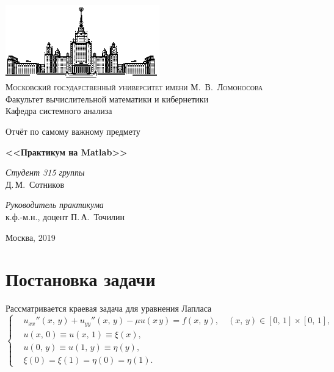 \documentclass[11pt]{article}
\begin{document}
\thispagestyle{empty}

\begin{center}
\ \vspace{-3cm}

\includegraphics[width=0.5\textwidth]{msu.eps}\\
{\scshape Московский государственный университет имени М.~В.~Ломоносова}\\
Факультет вычислительной математики и кибернетики\\
Кафедра системного анализа

\vfill

{\LARGE Отчёт по самому важному предмету}

\vspace{1cm}

{\Huge\bfseries <<Практикум на Matlab>>}
\end{center}

\vspace{1cm}

\begin{flushright}
  \large
  \textit{Студент 315 группы}\\
  Д.\,М.~Сотников

  \vspace{5mm}

  \textit{Руководитель практикума}\\
  к.ф.-м.н., доцент П.\,А.~Точилин
\end{flushright}

\vfill

\begin{center}
Москва, 2019
\end{center}

\newpage
\section{Постановка задачи}
Рассматривается краевая задача для уравнения Лапласа
\begin{equation}
\left\{
	\begin{aligned}
		& u_{xx}''\left(x, \, y\right) + u_{yy}''\left(x, \, y\right) - \mu u\left(x\, y\right) = \label{problem}
		f\left(x, \, y\right), \quad \left(x, \, y\right) \in \left[0, \, 1\right] \times \left[0, \, 1\right], \\
		& u\left(x, \, 0\right) \equiv u\left(x, \, 1\right) \equiv \xi\left(x\right), \\
		& u\left(0, \, y\right) \equiv u\left(1, \, y\right) \equiv \eta\left(y\right), \\ 
		& \xi\left(0\right) = \xi\left(1\right) = \eta\left(0\right) = \eta\left(1\right).
	\end{aligned}	
\right.
\end{equation}
\end{document}
